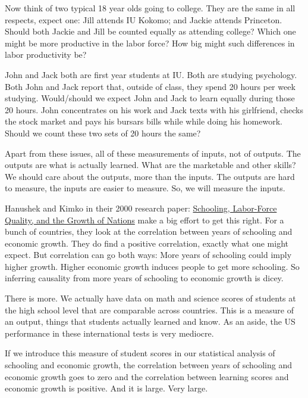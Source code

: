 \documentclass[
]{book}
\begin{document}
Now think of two typical 18 year olds going to college. They are the same in all respects, expect one: Jill attends IU Kokomo; and Jackie attends Princeton. Should both Jackie and Jill be counted equally as attending college? Which one might be more productive in the labor force? How big might such differences in labor productivity be?

John and Jack both are first year students at IU. Both are studying psychology. Both John and Jack report that, outside of class, they spend 20 hours per week studying. Would/should we expect John and Jack to learn equally during those 20 hours. John concentrates on his work and Jack texts with his girlfriend, checks the stock market and pays his bursars bills while while doing his homework. Should we count these two sets of 20 hours the same?

Apart from these issues, all of these measurements of inputs, not of outputs. The outputs are what is actually learned. What are the marketable and other skills? We should care about the outputs, more than the inputs. The outputs are hard to measure, the inputs are easier to measure. So, we will measure the inputs.

Hanushek and Kimko in their 2000 research paper: \href{https://www.researchgate.net/profile/Eric-Hanushek/publication/4980899_Schooling_Labor-Force_Quality_and_the_Growth_of_Nations/links/551427960cf283ee0834ac50/Schooling-Labor-Force-Quality-and-the-Growth-of-Nations.pdf}{Schooling, Labor-Force Quality, and the Growth of Nations} make a big effort to get this right. For a bunch of countries, they look at the correlation between years of schooling and economic growth. They do find a positive correlation, exactly what one might expect. But correlation can go both ways: More years of schooling could imply higher growth. Higher economic growth induces people to get more schooling. So inferring causality from more years of schooling to economic growth is dicey.

There is more. We actually have data on math and science scores of students at the high school level that are comparable across countries. This is a measure of an output, things that students actually learned and know. As an aside, the US performance in these international tests is very mediocre.

If we introduce this measure of student scores in our statistical analysis of schooling and economic growth, the correlation between years of schooling and economic growth goes to zero and the correlation between learning scores and economic growth is positive. And it is large. Very large.
\end{document}
